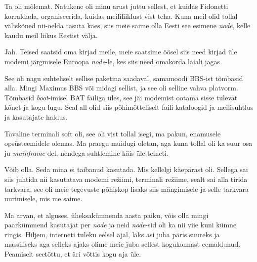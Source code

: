 Ta oli mõlemat. Natukene oli minu arust juttu  sellest, et kuidas Fidonetti  korraldada, organiseerida, kuidas  meililiiklust vist teha. Kuna meil olid tollal väliskõned nii-öelda tasuta käes, siis meie saime olla Eesti  see esimene \emph{node}, kelle kaudu meil  liikus Eestist välja. 


Jah. Teised saatsid oma kirjad meile, meie saatsime öösel siis need kirjad üle modemi järgmisele Euroopa \emph{node}-le, kes siis need omakorda laiali jagas.
                 

See oli nagu suhteliselt sellise paketina saadaval, samamoodi BBS-ist tõmbasid alla. Mingi Maximus BBS või midagi sellist, ja see oli selline vahva platvorm. Tõmbasid \emph{boot}-imisel BAT failiga üles, see jäi modemist ootama sisse tulevat kõnet ja kogu lugu. Seal all olid siis põhimõtteliselt faili kataloogid ja meilisuhtlus ja kasutajate haldus.


Tavaline terminali soft oli, see  oli vist tollal isegi, ma pakun, enamusele opsüsteemidele olemas. Ma praegu muidugi oletan, aga kuna tollal oli ka suur osa ju \emph{mainframe}-del, nendega suhtlemine käis üle telneti.


Võib olla. Seda mina ei taibanud kasutada. Mis kellelgi käepärast oli. Sellega sai siis juhtida nii kasutatava modemi režiimi, terminali režiime, sealt sai alla tirida tarkvara, see oli meie tegevuste põhiskop lisaks siis mängimisele ja selle tarkvara uurimisele, mis me saime.
                 

Ma arvan, et alguses, üheksakümnenda aasta paiku, võis olla mingi paarkümmend kasutajat per \emph{node} ja neid \emph{node}-sid oli ka nii viie kuni kümne ringis. Hiljem, interneti tuleku eelsel ajal, läks asi juba päris suureks ja massiliseks aga selleks ajaks olime meie juba sellest kogukonnast eemaldunud. Peamiselt seetõttu, et äri võttis kogu aja üle. 

